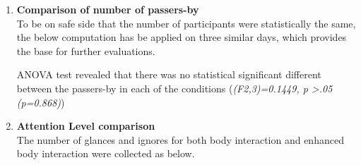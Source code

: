 \begin{enumerate}
\item \textbf{Comparison of number of passers-by} \\

To be on safe side that the number of participants were statistically the same, the below computation has be applied on three similar days, which provides the base for further evaluations.

\begin{table}[H]
\caption{Number of people for three conditions}
\label{tab:newbodypasserbyofthreeweeks}
\centering
{}
\end{table}

ANOVA test revealed that there was no statistical significant different between the passers-by in each of the conditions (\emph{(F2,3)=0.1449, p >.05 (p=0.868)})



\item \textbf{Attention Level comparison}  \\
The number of glances and ignores for both body interaction and enhanced body interaction were collected as below.


\begin{table}[H]
\caption{Cross tabulation for each condition attention level}
\label{tab:newbodycrosstabulationweeks}
\centering
{}
\end{table}



\end{enumerate}
